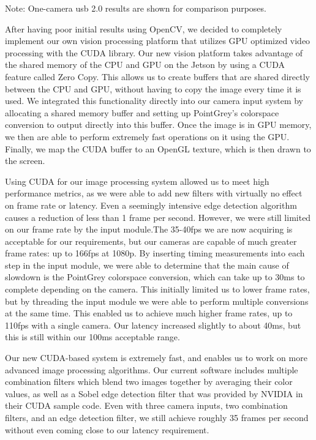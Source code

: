 \documentclass[letterpaper,10pt,titlepage]{IEEEtran}
\begin{document}
\par
Note: One-camera usb 2.0 results are shown for comparison purposes.\\
\par
After having poor initial results using OpenCV, we decided to completely implement our own vision processing platform that utilizes GPU optimized video processing with the CUDA library. Our new vision platform takes advantage of the shared memory of the CPU and GPU on the Jetson by using a CUDA feature called Zero Copy. This allows us to create buffers that are shared directly between the CPU and GPU, without having to copy the image every time it is used. We integrated this functionality directly into our camera input system by allocating a shared memory buffer and setting up PointGrey's colorspace conversion to output directly into this buffer. Once the image is in GPU memory, we then are able to perform extremely fast operations on it using the GPU. Finally, we map the CUDA buffer to an OpenGL texture, which is then drawn to the screen.  \\
\par
Using CUDA for our image processing system allowed us to meet high performance metrics, as we were able to add new filters with virtually no effect on frame rate or latency. Even a seemingly intensive edge detection algorithm causes a reduction of less than 1 frame per second. However, we were still limited on our frame rate by the input module.The 35-40fps we are now acquiring is acceptable for our requirements, but our cameras are capable of much greater frame rates: up to 166fps at 1080p. By inserting timing measurements into each step in the input module, we were able to determine that the main cause of slowdown is the PointGrey colorspace conversion, which can take up to 30ms to complete depending on the camera. This initially limited us to lower frame rates, but by threading the input module we were able to perform multiple conversions at the same time. This enabled us to achieve much higher frame rates, up to 110fps with a single camera. Our latency increased slightly to about 40ms, but this is still within our 100ms acceptable range.\\
\par
Our new CUDA-based system is extremely fast, and enables us to work on more advanced image processing algorithms. Our current software includes multiple combination filters which blend two images together by averaging their color values, as well as a Sobel edge detection filter that was provided by NVIDIA in their CUDA sample code. Even with three camera inputs, two combination filters, and an edge detection filter, we still achieve roughly 35 frames per second without even coming close to our latency requirement.\\
\end{document}
